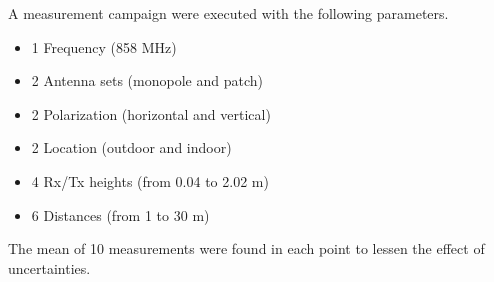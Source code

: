 \large
A measurement campaign were executed with the following parameters.
\begin{itemize}%
\item 1 Frequency (858 MHz)
\item 2 Antenna sets (monopole and patch)
\item 2 Polarization (horizontal and vertical)
\item 2 Location (outdoor and indoor)
\item 4 Rx/Tx heights (from 0.04 to 2.02 m)
\item 6 Distances (from 1 to 30 m)
\end{itemize}
The mean of 10 measurements were found in each point to lessen the effect of uncertainties. %
